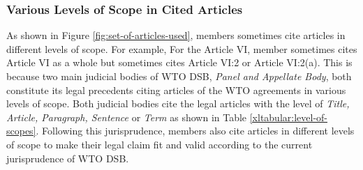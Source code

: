 \subsubsection{Various Levels of Scope in Cited Articles}
As shown in Figure \ref{fig:set-of-articles-used}, 
members sometimes
cite articles in different levels of scope. For example, 
For the Article VI, member sometimes cites
Article VI as a whole but sometimes cites
Article VI:2 or Article VI:2(a).
This is because two main judicial bodies of WTO DSB, \textit{Panel and Appellate Body}, 
both constitute its legal precedents citing articles of the WTO agreements in
various levels of scope.
Both judicial bodies cite the legal articles with the level of \textit{Title, Article, Paragraph, Sentence} or \textit{Term} as shown in Table {\ref{xltabular:level-of-scopes}}. 
Following this jurisprudence, members also cite articles in different levels of scope to 
make their legal claim fit and valid according to the current jurisprudence of WTO DSB.\\ %


